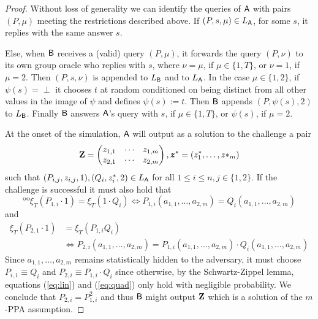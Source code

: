 \begin{proof}
Without loss of generality we can identify the queries of $\mathsf{A}$ with 
pairs $(P,\mu)$ meeting the restrictions described above. If $(P,s,\mu)\in L_{\mathsf{A}}$, for some $s$, it replies with the same answer $s$.

Else, when $\mathsf{B}$ receives a (valid) query $(P,\mu)$, it forwards the query $(P,\nu)$ to its own group oracle who replies with $s$, where $\nu=\mu$, if $\mu\in\{1,T\}$, or $\nu=1$, if $\mu=2$. Then $(P,s,\nu)$ is appended to $L_{\mathsf{B}}$ and to $L_{\mathsf{A}}$. In the case $\mu\in\{1,2\}$, if $\psi(s)=\perp$ it chooses $t$ at random conditioned on being distinct from all other values in the image of $\psi$ and defines $\psi(s):=t$. 
Then $\mathsf{B}$ appends $(P,\psi(s),2)$ to $L_{\mathsf{B}}$. Finally $\mathsf{B}$ answers $\mathsf{A}$'s query with $s$, if $\mu\in\{1,T\}$,  or $\psi(s)$, if $\mu=2$. 


At the onset of the simulation, $\mathsf{A}$ will output as a solution to the challenge a pair
$$
\mathbf{{Z}}=\left(\begin{matrix}z_{1,1}&\cdots&z_{1,m}\\z_{2,1}&\cdots&z_{2,m}\end{matrix}\right),{\boldsymbol{z}}^* = (z^*_1,\ldots,z*_m)
$$
such that 
$(P_{i,j},z_{i,j},1),(Q_{i},z^*_i,2) \in L_{\mathsf{A}}$ for all $1\leq i\leq n,j\in\{1,2\}$. If the challenge is successful it must also hold that
\begin{equation}ºº
\xi_T(P_{1,i}\cdot 1)=\xi_T(1\cdot Q_i) \Longleftrightarrow P_{1,i}(a_{1,1},\ldots,a_{2,m})=Q_{i}(a_{1,1},\ldots,a_{2,m})
\label{eq:lin}
\end{equation}
and
\begin{align}
	\xi_T(P_{2,1}\cdot 1) &=\xi_T(P_{1,i}Q_i) \nonumber\\
	&\Longleftrightarrow P_{2,i}(a_{1,1},\ldots,a_{2,m})=P_{1,i}(a_{1,1},\ldots,a_{2,m})\cdot Q_{i}(a_{1,1},\ldots,a_{2,m})
	\label{eq:quad}
\end{align}
Since $a_{1,1},\ldots,a_{2,m}$ remains statistically hidden to the adversary, it must choose $P_{i,1}\equiv Q_i$ and $P_{2,i}\equiv P_{1,i}\cdot Q_i$ since otherwise, by the Schwartz-Zippel lemma, equations (\ref{eq:lin}) and (\ref{eq:quad}) only hold with negligible probability. We conclude that $P_{2,i}=P^2_{1,i}$ and thus $\mathsf{B}$ might output $\mathbf{{Z}}$ which is a solution of the $m$-PPA assumption.
\end{proof}


